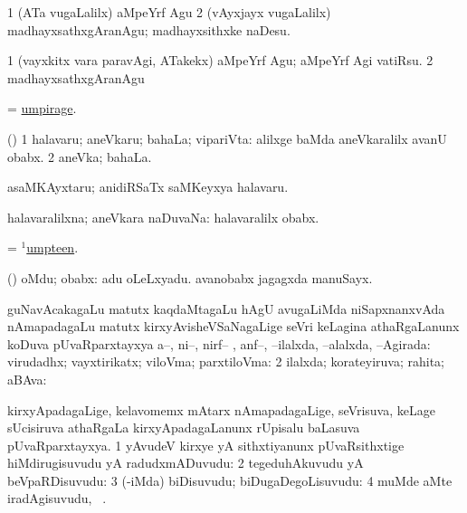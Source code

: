 \bentry
{} 
\gl{\sakirx}
\expl{}
\bmng
\bnum
\num{1} (ATa \mo vugaLalilx) aMpeYrf Agu 
\num{2} (vAyxjayx \mo vugaLalilx) madhayxsathxgAranAgu; madhayxsithxke naDesu. 
\enum
\emng

\noindent 
\gl{\akirx}
\expl{}
\bmng
\bnum
\num{1} (vayxkitx \mo vara paravAgi, ATakekx) aMpeYrf Agu; aMpeYrf Agi vatiRsu. 
\num{2} madhayxsathxgAranAgu 
\enum
\emng
\eentry

\bentry
{} 
\gl{\nA}
\expl{}
\bmng
= \hyperlink{umpirage}{umpirage}. 
\emng
\eentry

\bentry
{} 
\gl{\gu}
\expl{}
\bmng
(\ashi) 
\bnum
\num{1} halavaru; aneVkaru; bahaLa; vipariVta:  alilxge baMda aneVkaralilx avanU obabx. 
\num{2} aneVka; bahaLa. 
\enum
\emng
\eentry

\bentry
{} 
\gl{\sanA}
\expl{}
\bmng
asaMKAyxtaru; anidiRSaTx saMKeyxya halavaru. 
\emng
\eentry

\bentry
{} 
\gl{\gu}
\expl{}
\bmng
halavaralilxna; aneVkara naDuvaNa:  halavaralilx obabx. 
\emng
\eentry

\bentry
{} 
\gl{\gu}
\expl{}
\bmng
= \hyperlink{umpteen(1)}{$^1$umpteen}. 
\emng
\eentry

\bentry
{} 
\gl{\saMkiSx}
\expl{}
\bmng
{} 
\emng
\eentry

\bentry
{} 
\gl{\nA}
\expl{}
\bmng
\sA (\AmA) oMdu; obabx:  adu oLeLxyadu.  avanobabx jagagxda manuSayx. 
\emng
\eentry

\bentry
{} 
\gl{\pUparx}
\expl{}
\bmng
\bnum
{} guNavAcakagaLu matutx kaqdaMtagaLu hAgU avugaLiMda niSapxnanxvAda nAmapadagaLu matutx kirxyAvisheVSaNagaLige seVri keLagina athaRgaLanunx koDuva pUvaRparxtayxya 
\banum
{} a--, ni--, nirf-- , anf--, --ilalxda, --alalxda, --Agirada:  
 virudadhx; vayxtirikatx; viloVma; parxtiloVma:  
\eanum
\numie
\num{2} ilalxda; korateyiruva; rahita; aBAva:  
\enum
\emng
\eentry

\bentry
{} 
\gl{\pUparx}
\expl{}
\bmng
kirxyApadagaLige, kelavomemx mAtarx nAmapadagaLige, seVrisuva, keLage sUcisiruva athaRgaLa kirxyApadagaLanunx rUpisalu baLasuva pUvaRparxtayxya. 
\bnum
\num{1} yAvudeV kirxye yA sithxtiyanunx pUvaRsithxtige hiMdirugisuvudu yA radudxmADuvudu:  
\num{2} tegeduhAkuvudu yA beVpaRDisuvudu:  
\num{3} (-iMda) biDisuvudu; biDugaDegoLisuvudu:  
\num{4} muMde aMte iradAgisuvudu, \udA\ . 
\enum
\emng
\eentry

